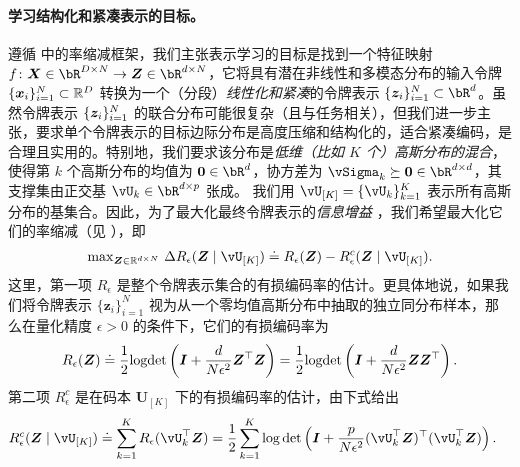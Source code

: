 \documentclass[../../book-main.tex]{subfiles}
\begin{document}
\paragraph{学习结构化和紧凑表示的目标。}
遵循  中的率缩减框架，我们主张表示学习的目标是找到一个特征映射 \(f \colon \X \in \bR^{D \times N} \to \Z\in \bR^{d \times N}\)，它将具有潜在非线性和多模态分布的输入令牌 \(\{\bm x_i\}_{i=1}^N \subset \mathbb{R}^D\) 转换为一个（分段）\textit{线性化和紧凑}的令牌表示 \(\{\bm z_i\}_{i=1}^N \subset \bR^{d}\)。虽然令牌表示 \(\{\bm{z}_{i}\}_{i = 1}^{N}\) 的联合分布可能很复杂（且与任务相关），但我们进一步主张，要求单个令牌表示的目标边际分布是高度压缩和结构化的，适合紧凑编码，是合理且实用的。特别地，我们要求该分布是\textit{低维（比如 \(K\) 个）高斯分布的混合}，使得第 \(k\) 个高斯分布的均值为 \(\Zero \in \bR^{d}\)，协方差为 \(\vSigma_{k} \succeq \Zero \in \bR^{d \times d}\)，其支撑集由正交基 \(\vU_{k} \in \bR^{d \times p}\) 张成。
我们用 $\vU_{[K]} = \{\vU_k\}_{k=1}^K$ 表示所有高斯分布的基集合。因此，为了最大化最终令牌表示的\textit{信息增益} \cite{ma2022principles}，我们希望最大化它们的率缩减（见 ），即
\begin{align}\label{eq:rate reduction}
    \mathrm{max}_{\bm Z \in \R^{d\times N}}\ \Delta R_{\epsilon}(\Z \mid \vU_{[K]}) \doteq R_{\epsilon}(\Z) - R^c_{\epsilon}(\Z \mid \vU_{[K]}).
\end{align}
这里，第一项 $R_{\epsilon}$ 是整个令牌表示集合的有损编码率的估计。更具体地说，如果我们将令牌表示 $\{\bm z_i\}_{i=1}^N$ 视为从一个零均值高斯分布中抽取的独立同分布样本，那么在量化精度 $\epsilon > 0$ 的条件下，它们的有损编码率为
\begin{equation}\label{eq:coding_rate}
    R_{\epsilon}(\bm{Z}) \doteq \frac{1}{2}\textrm{logdet}\left(\bm{I} + \frac{d}{N\epsilon^{2}}\bm{Z}^{\top}\bm{Z}\right) = \frac{1}{2}\textrm{logdet}\left(\bm{I} + \frac{d}{N\epsilon^{2}}\bm{Z}\bm{Z}^{\top}\right).
\end{equation}
第二项 $R_{\epsilon}^c$ 是在码本 $\bm U_{[K]}$ 下的有损编码率的估计，由下式给出
\begin{equation}
\begin{aligned}
    R_{\epsilon}^c(\Z \mid \vU_{[K]}) &\doteq \sum_{k=1}^{K}R_{\epsilon}(\vU_k^{\top} \Z) = \frac{1}{2}\sum_{k=1}^{K}\log\det\left(\I +
    \frac{p}{N\epsilon^{2}}(\vU_k^{\top}\Z)^{\top}(\vU_k^{\top}\Z)\right).
\end{aligned}
\label{eq:def-mcr-Rc}
\end{equation}
\end{document}
